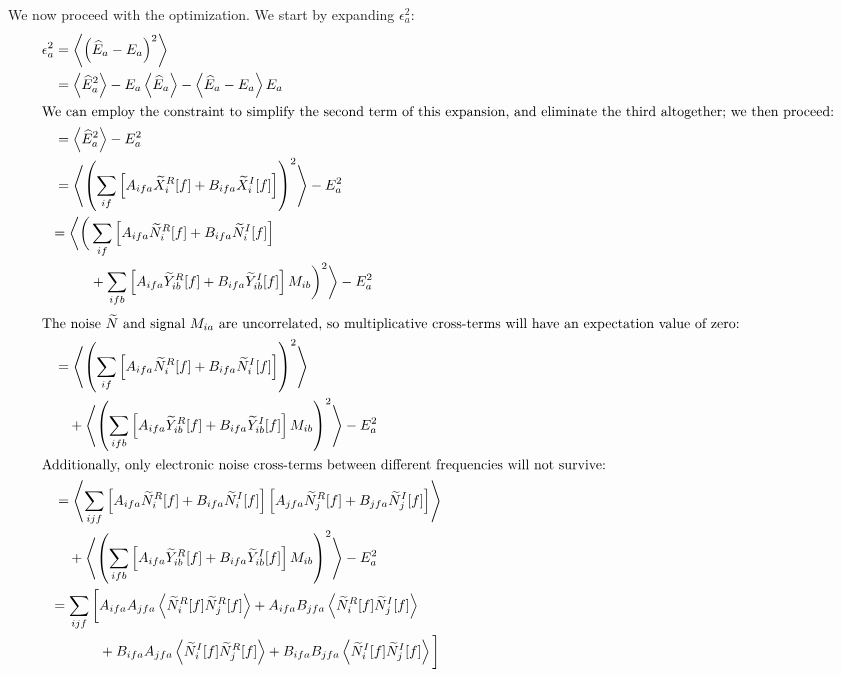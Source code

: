 We now proceed with the optimization.  We start by expanding $\epsilon^2_a$:
\begin{align*}
\epsilon^2_a &= \left< \left(\widehat{E}_a - E_a\right)^2\right> \\
%
&= \left< \widehat{E}^2_a \right> - E_a \left<\widehat{E}_a\right> - \left< \widehat{E}_a - E_a \right> E_a \\
%
\intertext{We can employ the constraint to simplify the second term of this expansion, and eliminate the third altogether; we then proceed:}
%
&= \left< \widehat{E}^2_a \right> - E^2_a \\
%
&= \left< \left(\sum_{if}\left[ A_{ifa} \widetilde{X}_i^R[f] + B_{ifa} \widetilde{X}_i^I[f]\right]\right)^2\right> - E^2_a \\
%
& \begin{aligned}= \bigg< \bigg(&
  \sum_{if} \left[ A_{ifa} \widetilde{N}_i^R[f] + B_{ifa} \widetilde{N}_i^I[f]\right] \\
  & + \sum_{ifb} \left[ A_{ifa} \widetilde{Y}_{ib}^R[f] + B_{ifa} \widetilde{Y}_{ib}^I[f]\right]M_{ib}  \bigg)^2 \bigg> - E^2_a
\end{aligned} \\
%
\intertext{The noise $\widetilde{N}$ and signal $M_{ia}$ are uncorrelated, so multiplicative cross-terms will have an expectation value of zero:}
%
&= \left< \left(\sum_{if} \left[ A_{ifa} \widetilde{N}_i^R[f] + B_{ifa} \widetilde{N}_i^I[f]\right]\right)^2\right> \\
&\quad + \left<\left(\sum_{ifb} \left[ A_{ifa} \widetilde{Y}_{ib}^R[f] + B_{ifa} \widetilde{Y}_{ib}^I[f]\right]M_{ib} \right)^2 \right> - E^2_a \\
%
\intertext{Additionally, only electronic noise cross-terms between different frequencies will not survive:}
%
&= \left< \sum_{ijf} \left[ A_{ifa} \widetilde{N}_i^R[f] + B_{ifa} \widetilde{N}_i^I[f]\right] \left[ A_{jfa} \widetilde{N}_j^R[f] + B_{jfa} \widetilde{N}_j^I[f]\right] \right> \\
&\quad + \left<\left(\sum_{ifb} \left[ A_{ifa} \widetilde{Y}_{ib}^R[f] + B_{ifa} \widetilde{Y}_{ib}^I[f]\right]M_{ib} \right)^2 \right> - E^2_a \\
%
& \begin{aligned}
  = \sum_{ijf} \bigg[ & A_{ifa}A_{jfa} \left<\widetilde{N}_i^R[f]\widetilde{N}_j^R[f]\right> + A_{ifa}B_{jfa} \left<\widetilde{N}_i^R[f]\widetilde{N}_j^I[f]\right> \\
  & + B_{ifa}A_{jfa} \left<\widetilde{N}_i^I[f]\widetilde{N}_j^R[f]\right> + B_{ifa}B_{jfa} \left<\widetilde{N}_i^I[f]\widetilde{N}_j^I[f]\right>\bigg] \end{aligned} \\

\end{align*}
